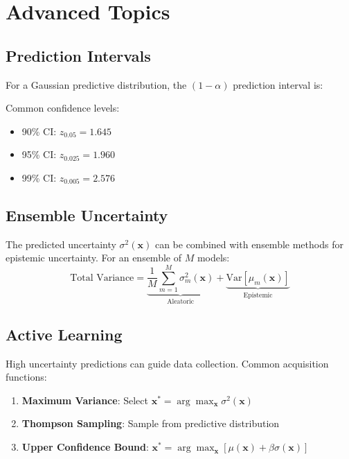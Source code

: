 \documentclass[11pt,a4paper]{article}
\begin{document}
\section{Advanced Topics}

\subsection{Prediction Intervals}

For a Gaussian predictive distribution, the $(1-\alpha)$ prediction interval is:
\begin{equation}
[\mu(\mathbf{x}) - z_{\alpha/2}\sigma(\mathbf{x}), \mu(\mathbf{x}) + z_{\alpha/2}\sigma(\mathbf{x})]
\end{equation}

Common confidence levels:
\begin{itemize}
    \item 90\% CI: $z_{0.05} = 1.645$
    \item 95\% CI: $z_{0.025} = 1.960$
    \item 99\% CI: $z_{0.005} = 2.576$
\end{itemize}

\subsection{Ensemble Uncertainty}

The predicted uncertainty $\sigma^2(\mathbf{x})$ can be combined with ensemble methods for epistemic uncertainty. For an ensemble of $M$ models:
\begin{equation}
\text{Total Variance} = \underbrace{\frac{1}{M}\sum_{m=1}^M \sigma_m^2(\mathbf{x})}_{\text{Aleatoric}} + \underbrace{\text{Var}[\mu_m(\mathbf{x})]}_{\text{Epistemic}}
\end{equation}

\subsection{Active Learning}

High uncertainty predictions can guide data collection. Common acquisition functions:
\begin{enumerate}
    \item \textbf{Maximum Variance}: Select $\mathbf{x}^* = \arg\max_{\mathbf{x}} \sigma^2(\mathbf{x})$
    \item \textbf{Thompson Sampling}: Sample from predictive distribution
    \item \textbf{Upper Confidence Bound}: $\mathbf{x}^* = \arg\max_{\mathbf{x}} [\mu(\mathbf{x}) + \beta\sigma(\mathbf{x})]$
\end{enumerate}
\end{document}
